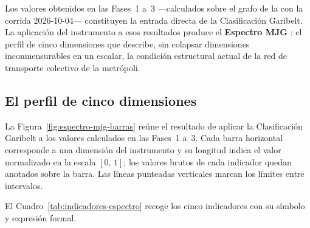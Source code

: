 

\label{subsec:espectro-mjg}

Los valores obtenidos en las Fases~1 a~3 ---calculados sobre el grafo de la
\zmvm{} con la corrida 2026-10-04--- constituyen la entrada directa de la Clasificación Garibelt.
La aplicación del instrumento a esos resultados produce el
\textbf{Espectro MJG} : el perfil de cinco dimensiones que describe, sin colapsar
dimensiones inconmensurables en un escalar, la condición estructural actual de
la red de transporte colectivo de la metrópoli.

\subsection{El perfil de cinco dimensiones}
\label{subsubsec:espectro-tabla}

La Figura~\ref{fig:espectro-mjg-barras} reúne el resultado de aplicar la
Clasificación Garibelt a los valores calculados en las Fases~1 a~3. Cada barra
horizontal corresponde a una dimensión del instrumento y su longitud indica el
valor normalizado en la escala $[0,\,1]$; los valores brutos de cada indicador
quedan anotados sobre la barra. Las líneas punteadas verticales marcan los
límites entre intervalos.

El Cuadro~\ref{tab:indicadores-espectro} recoge los cinco indicadores con su
símbolo y expresión formal.

